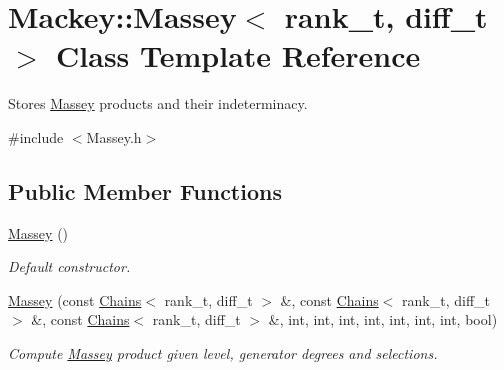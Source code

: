 \hypertarget{classMackey_1_1Massey}{}\section{Mackey\+:\+:Massey$<$ rank\+\_\+t, diff\+\_\+t $>$ Class Template Reference}
\label{classMackey_1_1Massey}


Stores \hyperlink{classMackey_1_1Massey}{Massey} products and their indeterminacy.  




{\ttfamily \#include $<$Massey.\+h$>$}

\subsection*{Public Member Functions}
\begin{DoxyCompactItemize}
\item 
\hyperlink{classMackey_1_1Massey_a9e48aaa79f409e96ae2051719710315c}{Massey} ()
\begin{DoxyCompactList}\small\item\em Default constructor. \end{DoxyCompactList}\item 
\hyperlink{classMackey_1_1Massey_ab9dccd95db4477c103e1e790f6796735}{Massey} (const \hyperlink{classMackey_1_1Chains}{Chains}$<$ rank\+\_\+t, diff\+\_\+t $>$ \&, const \hyperlink{classMackey_1_1Chains}{Chains}$<$ rank\+\_\+t, diff\+\_\+t $>$ \&, const \hyperlink{classMackey_1_1Chains}{Chains}$<$ rank\+\_\+t, diff\+\_\+t $>$ \&, int, int, int, int, int, int, int, bool)
\begin{DoxyCompactList}\small\item\em Compute \hyperlink{classMackey_1_1Massey}{Massey} product given level, generator degrees and selections. \end{DoxyCompactList}\end{DoxyCompactItemize}
